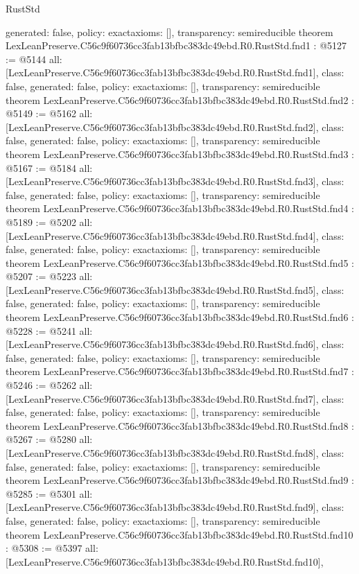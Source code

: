 \begin{lexlean}{RustStd}
\begin{coremodule}
{  generated: false,
  policy: exact{axioms: []},
  transparency: semireducible
}
theorem LexLeanPreserve.C56c9f60736cc3fab13bfbc383dc49ebd.R0.RustStd.fnd1 : @5127 := @5144 {
  all: [LexLeanPreserve.C56c9f60736cc3fab13bfbc383dc49ebd.R0.RustStd.fnd1],
  class: false,
  generated: false,
  policy: exact{axioms: []},
  transparency: semireducible
}
theorem LexLeanPreserve.C56c9f60736cc3fab13bfbc383dc49ebd.R0.RustStd.fnd2 : @5149 := @5162 {
  all: [LexLeanPreserve.C56c9f60736cc3fab13bfbc383dc49ebd.R0.RustStd.fnd2],
  class: false,
  generated: false,
  policy: exact{axioms: []},
  transparency: semireducible
}
theorem LexLeanPreserve.C56c9f60736cc3fab13bfbc383dc49ebd.R0.RustStd.fnd3 : @5167 := @5184 {
  all: [LexLeanPreserve.C56c9f60736cc3fab13bfbc383dc49ebd.R0.RustStd.fnd3],
  class: false,
  generated: false,
  policy: exact{axioms: []},
  transparency: semireducible
}
theorem LexLeanPreserve.C56c9f60736cc3fab13bfbc383dc49ebd.R0.RustStd.fnd4 : @5189 := @5202 {
  all: [LexLeanPreserve.C56c9f60736cc3fab13bfbc383dc49ebd.R0.RustStd.fnd4],
  class: false,
  generated: false,
  policy: exact{axioms: []},
  transparency: semireducible
}
theorem LexLeanPreserve.C56c9f60736cc3fab13bfbc383dc49ebd.R0.RustStd.fnd5 : @5207 := @5223 {
  all: [LexLeanPreserve.C56c9f60736cc3fab13bfbc383dc49ebd.R0.RustStd.fnd5],
  class: false,
  generated: false,
  policy: exact{axioms: []},
  transparency: semireducible
}
theorem LexLeanPreserve.C56c9f60736cc3fab13bfbc383dc49ebd.R0.RustStd.fnd6 : @5228 := @5241 {
  all: [LexLeanPreserve.C56c9f60736cc3fab13bfbc383dc49ebd.R0.RustStd.fnd6],
  class: false,
  generated: false,
  policy: exact{axioms: []},
  transparency: semireducible
}
theorem LexLeanPreserve.C56c9f60736cc3fab13bfbc383dc49ebd.R0.RustStd.fnd7 : @5246 := @5262 {
  all: [LexLeanPreserve.C56c9f60736cc3fab13bfbc383dc49ebd.R0.RustStd.fnd7],
  class: false,
  generated: false,
  policy: exact{axioms: []},
  transparency: semireducible
}
theorem LexLeanPreserve.C56c9f60736cc3fab13bfbc383dc49ebd.R0.RustStd.fnd8 : @5267 := @5280 {
  all: [LexLeanPreserve.C56c9f60736cc3fab13bfbc383dc49ebd.R0.RustStd.fnd8],
  class: false,
  generated: false,
  policy: exact{axioms: []},
  transparency: semireducible
}
theorem LexLeanPreserve.C56c9f60736cc3fab13bfbc383dc49ebd.R0.RustStd.fnd9 : @5285 := @5301 {
  all: [LexLeanPreserve.C56c9f60736cc3fab13bfbc383dc49ebd.R0.RustStd.fnd9],
  class: false,
  generated: false,
  policy: exact{axioms: []},
  transparency: semireducible
}
theorem LexLeanPreserve.C56c9f60736cc3fab13bfbc383dc49ebd.R0.RustStd.fnd10 : @5308 := @5397 {
  all: [LexLeanPreserve.C56c9f60736cc3fab13bfbc383dc49ebd.R0.RustStd.fnd10],
}
\end{coremodule}
\end{lexlean}
